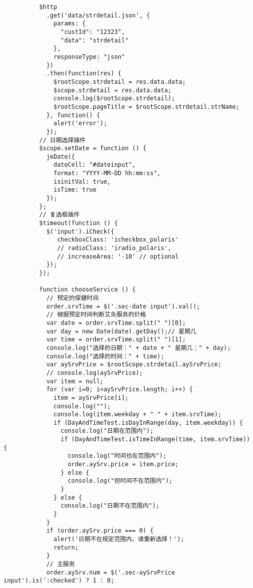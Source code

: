 \begin{lstlisting}
          $http
            .get('data/strdetail.json', {
              params: {
                "custId": "12323",
                "data": "strdetail"
              },
              responseType: "json"
            })
            .then(function(res) {
              $rootScope.strdetail = res.data.data;
              $scope.strdetail = res.data.data;
              console.log($rootScope.strdetail);
              $rootScope.pageTitle = $rootScope.strdetail.strName;
            }, function() {
              alert('error');
            });
          // 日期选择插件
          $scope.setDate = function () {
            jeDate({
              dateCell: "#dateinput",
              format: "YYYY-MM-DD hh:mm:ss",
              isinitVal: true,
              isTime: true
            });
          };
          // 复选框插件
          $timeout(function () {
            $('input').iCheck({
               checkboxClass: 'icheckbox_polaris'
               // radioClass: 'iradio_polaris',
               // increaseArea: '-10' // optional
            });
          });

          function chooseService () {
            // 预定的保健时间
            order.srvTime = $('.sec-date input').val();
            // 根据预定时间判断艾灸服务的价格
            var date = order.srvTime.split(" ")[0];
            var day = new Date(date).getDay();// 星期几
            var time = order.srvTime.split(" ")[1];
            console.log("选择的日期：" + date + " 星期几：" + day);
            console.log("选择的时间：" + time);
            var aySrvPrice = $rootScope.strdetail.aySrvPrice;
            // console.log(aySrvPrice);
            var item = null;
            for (var i=0; i<aySrvPrice.length; i++) {
              item = aySrvPrice[i];
              console.log("");
              console.log(item.weekday + " " + item.srvTime);
              if (DayAndTimeTest.isDayInRange(day, item.weekday)) {
                console.log("日期在范围内");
                if (DayAndTimeTest.isTimeInRange(time, item.srvTime)) {
                  console.log("时间也在范围内");
                  order.aySrv.price = item.price;
                } else {
                  console.log("但时间不在范围内");
                }
              } else {
                console.log("日期不在范围内");
              }
            }
            if (order.aySrv.price === 0) {
              alert('日期不在规定范围内，请重新选择！');
              return;
            }
            // 主服务
            order.aySrv.num = $('.sec-aySrvPrice input').is(':checked') ? 1 : 0;


\end{lstlisting}
